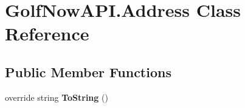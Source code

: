 \hypertarget{class_golf_now_a_p_i_1_1_address}{}\section{Golf\+Now\+A\+P\+I.\+Address Class Reference}
\label{class_golf_now_a_p_i_1_1_address}
\subsection*{Public Member Functions}
\begin{DoxyCompactItemize}
\item 
\mbox{\label{class_golf_now_a_p_i_1_1_address_a694321b81c51a20bff9cd07d3307f3f4}} 
override string {\bfseries To\+String} ()
\end{DoxyCompactItemize}
